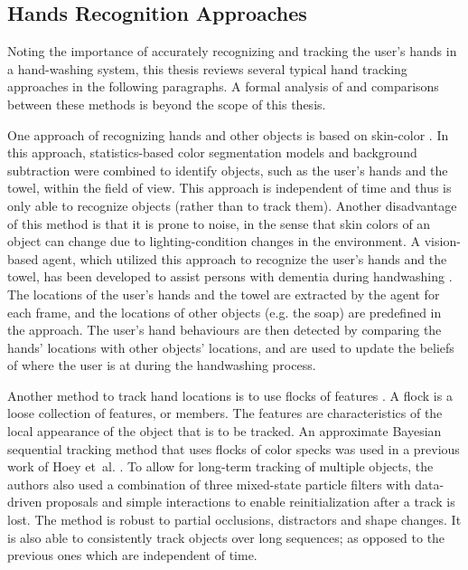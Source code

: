 \subsection{Hands Recognition Approaches}

Noting the importance of accurately recognizing and tracking the user's hands in a hand-washing system, this thesis reviews several typical hand tracking approaches in the following paragraphs. A formal analysis of and comparisons between these methods is beyond the scope of this thesis.

One approach of recognizing hands and other objects is based on skin-color \cite{mihailidis2004use}. In this approach, statistics-based color segmentation models and background subtraction were combined to identify objects, such as the user's hands and the towel, within the field of view. This approach is independent of time and thus is only able to recognize objects (rather than to track them). Another disadvantage of this method is that it is prone to noise, in the sense that skin colors of an object can change due to lighting-condition changes in the environment. A vision-based agent, which utilized this approach to recognize the user's hands and the towel, has been developed to assist persons with dementia during handwashing \cite{boger2005decision}. The locations of the user's hands and the towel are extracted by the agent for each frame, and the locations of other objects (e.g. the soap) are predefined in the approach. The user's hand behaviours are then detected by comparing the hands' locations with other objects' locations, and are used to update the beliefs of where the user is at during the handwashing process. 

Another method to track hand locations is to use flocks of features \cite{hoey2006tracking}. A flock is a loose collection of features, or members. The features are characteristics of the local appearance of the object that is to be tracked. An approximate Bayesian sequential tracking method that uses flocks of color specks was used in a previous work of Hoey et~al. \cite{hoey2006tracking}. To allow for long-term tracking of multiple objects, the authors also used a combination of three mixed-state particle filters \cite{isard1998mixed} with data-driven proposals \cite{okuma2004boosted} and simple interactions to enable reinitialization after a track is lost. The method is robust to partial occlusions, distractors and shape changes. It is also able to consistently track objects over long sequences; as opposed to the previous ones which are independent of time.

